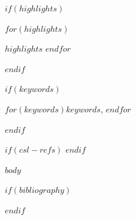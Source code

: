 \documentclass[preprint,12pt,authoryear]{elsarticle}
\begin{document}
\begin{frontmatter}
$if(highlights)$
\begin{highlights}
$for(highlights)$\item $highlights$
$endfor$
\end{highlights}
$endif$

$if(keywords)$
\begin{keyword}
$for(keywords)$$keywords$\sep
$endfor$
\end{keyword}
$endif$

$if(csl-refs)$
\NewDocumentCommand\citeproctext{}{}
\NewDocumentCommand{}
\makeatletter
\let\@cite@ofmt\@firstofone
\def\@biblabel#1{}
\def\@cite#1#2{{#1\if@tempswa , #2\fi}}
\makeatother
\newlength{\cslhangindent}
\setlength{\cslhangindent}{1.5em}
\newlength{\csllabelwidth}
\setlength{\csllabelwidth}{3em}
\newenvironment{CSLReferences}[2] %
{\begin{list}{}{%
	\setlength{\itemindent}{0pt}
	\setlength{\leftmargin}{0pt}
	\setlength{\parsep}{0pt}
	\ifodd #1
	\setlength{\leftmargin}{\cslhangindent}
	\setlength{\itemindent}{-1\cslhangindent}
	\fi
	\setlength{\itemsep}{#2\baselineskip}}}
{\end{list}}
\newcommand{\CSLBlock}[1]{\hfill\break\parbox[t]{\linewidth}{\strut\ignorespaces#1\strut}}
\newcommand{\CSLLeftMargin}[1]{\parbox[t]{\csllabelwidth}{\strut#1\strut}}
\newcommand{\CSLRightInline}[1]{\parbox[t]{\linewidth - \csllabelwidth}{\strut#1\strut}}
\newcommand{\CSLIndent}[1]{\hspace{\cslhangindent}#1}
$endif$


\end{frontmatter}


$body$

$if(bibliography)$

$endif$
\end{document}

